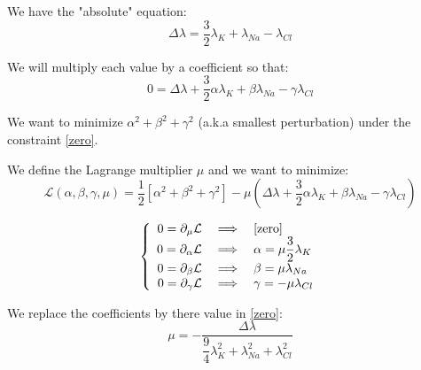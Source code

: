 \documentclass[aps,12pt]{revtex4}
\begin{document}
We have the "absolute" equation:
\begin{equation}
	\Delta \lambda = \dfrac{3}{2} \lambda_K + \lambda_{Na} - \lambda_{Cl}
\end{equation}

We will multiply each value by a coefficient so that:
\begin{equation}
	\label{zero}
		0 = \Delta \lambda + \dfrac{3}{2} \alpha \lambda_K + \beta \lambda_{Na} - \gamma \lambda_{Cl} 
\end{equation}

We want to minimize $\alpha^2+\beta^2+\gamma^2$ (a.k.a smallest perturbation)
under the constraint \eqref{zero}.

We define the Lagrange multiplier $\mu$ and we want to minimize:
\begin{equation}
	\mathcal L (\alpha,\beta,\gamma,\mu) = \dfrac{1}{2} \left[ \alpha^2+\beta^2+\gamma^2 \right]  - \mu\left( \Delta \lambda + \dfrac{3}{2} \alpha \lambda_K + \beta \lambda_{Na} - \gamma \lambda_{Cl}\right)
\end{equation}

\begin{equation}
\left\lbrace
\begin{array}{rcl}
0 = \partial_\mu \mathcal L & \implies & \text{\eqref{zero}}\\
0 = \partial_\alpha \mathcal L & \implies & \alpha = \mu \dfrac{3}{2} \lambda_K \\
0 = \partial_\beta \mathcal L & \implies & \beta   = \mu   \lambda_{Na} \\
0 = \partial_\gamma \mathcal L & \implies & \gamma = -\mu  \lambda_{Cl} \\
\end{array}
\right.
\end{equation}

We replace the coefficients by there value in \eqref{zero}:
\begin{equation}
\mu = - \dfrac{\Delta \lambda}{ \dfrac{9}{4}\lambda_K^2 + \lambda_{Na}^2 + \lambda_{Cl}^2}
\end{equation}
\end{document}
